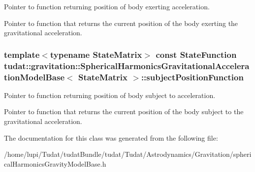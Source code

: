 Pointer to function returning position of body exerting acceleration. 

Pointer to function that returns the current position of the body exerting the gravitational acceleration. 
\subsubsection[{\texorpdfstring{subject\+Position\+Function}{subjectPositionFunction}}]{\setlength{\rightskip}{0pt plus 5cm}template$<$typename State\+Matrix$>$ const {\bf State\+Function} {\bf tudat\+::gravitation\+::\+Spherical\+Harmonics\+Gravitational\+Acceleration\+Model\+Base}$<$ State\+Matrix $>$\+::subject\+Position\+Function\hspace{0.3cm}{\ttfamily [protected]}}\hypertarget{classtudat_1_1gravitation_1_1SphericalHarmonicsGravitationalAccelerationModelBase_a302efd9e7b078e67f3d475e613c96da1}{}\label{classtudat_1_1gravitation_1_1SphericalHarmonicsGravitationalAccelerationModelBase_a302efd9e7b078e67f3d475e613c96da1}


Pointer to function returning position of body subject to acceleration. 

Pointer to function that returns the current position of the body subject to the gravitational acceleration. 

The documentation for this class was generated from the following file\+:\begin{DoxyCompactItemize}
\item 
/home/lupi/\+Tudat/tudat\+Bundle/tudat/\+Tudat/\+Astrodynamics/\+Gravitation/spherical\+Harmonics\+Gravity\+Model\+Base.\+h\end{DoxyCompactItemize}
